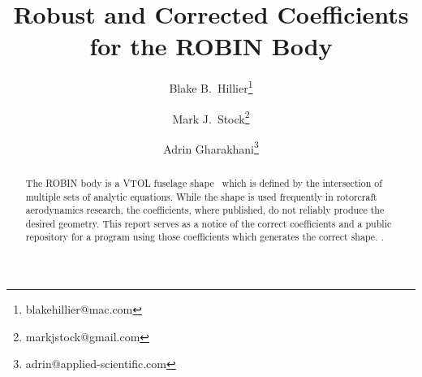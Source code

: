 \documentclass{ahs}
\begin{document}
\title{Robust and Corrected Coefficients for the ROBIN Body}

\author{Blake B.~Hillier\thanks{blakehillier@mac.com}}
\author{Mark J.~Stock\thanks{markjstock@gmail.com}}
\author{Adrin Gharakhani\thanks{adrin@applied-scientific.com}}

\maketitle

\begin{abstract}
The ROBIN body is a VTOL fuselage shape~
which is defined by the intersection of multiple sets of analytic equations.
While the shape is used frequently in rotorcraft aerodynamics research, the coefficients,
where published, do not reliably produce the desired geometry.
This report serves as a notice of the correct coefficients and a public repository
for a program using those coefficients which generates the correct shape. .
\end{abstract}

\begin{nomenclature}[$C_{p}$]
\end{nomenclature}
\end{document}
